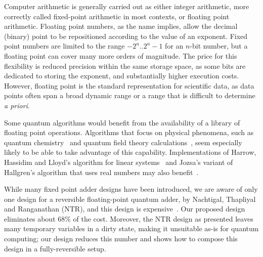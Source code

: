 \documentclass[%
reprint11,
 amsmath,amssymb,
 aps,
]{revtex4-1}
\begin{document}


\par Computer arithmetic is generally carried out as either integer
arithmetic, more correctly called fixed-point arithmetic in most
contexts, or floating point arithmetic. Floating point numbers, as the
name implies, allow the decimal (binary) point to be repositioned
according to the value of an exponent. Fixed point numbers are limited
to the range $-2^n..2^n-1$ for an $n$-bit number, but a floating point
can cover many more orders of magnitude. The price for this
flexibility is reduced precision within the same storage space, as
some bits are dedicated to storing the exponent, and substantially
higher execution costs. However, floating point is the standard
representation for scientific data, as data points often span a broad
dynamic range or a range that is difficult to determine \emph{a
  priori}.

\par Some quantum algorithms would benefit from the availability of a
library of floating point operations. Algorithms that focus on
physical phenomena, such as quantum
chemistry~\cite{brown10:q-sims-entropy,kassal11:qchem-sim-review} and
quantum field theory calculations~\cite{jordan12:qa-qft}, seem
especially likely to be able to take advantage of this
capability. Implementations of Harrow, Hassidim and Lloyd's algorithm
for linear systems~\cite{clader2013quantum,harrow:lineqs} and Jozsa's
variant of Hallgren's algorithm that uses real numbers may also
benefit~\cite{jozsa2003notes}.

\par While many fixed point adder designs have been introduced, we are
aware of only one design for a reversible floating-point quantum
adder, by Nachtigal, Thapliyal and Ranganathan (NTR), and this design
is expensive~\cite{nachtigal}. Our proposed design eliminates about
68\% of the cost. Moreover, the NTR design as presented leaves many
temporary variables in a dirty state, making it unsuitable as-is for
quantum computing; our design reduces this number and shows how to
compose this design in a fully-reversible setup.
\end{document}
